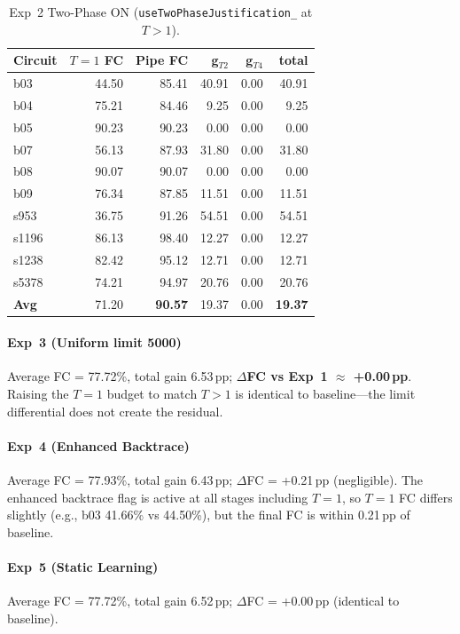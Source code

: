 \documentclass[conference]{IEEEtran}
\begin{document}
\begin{table}[t]
\caption{Exp~2 Two-Phase ON (\texttt{useTwoPhaseJustification\_} at $T{>}1$).}
\label{tab:exp2}
\centering
\footnotesize
\begin{tabular}{@{}lrrrrr@{}}
\toprule
Circuit & $T{=}1$ FC & Pipe FC & g$_{T2}$ & g$_{T4}$ & total \\
\midrule
b03   & 44.50 & 85.41 & 40.91 & 0.00 & 40.91 \\
b04   & 75.21 & 84.46 & 9.25  & 0.00 & 9.25 \\
b05   & 90.23 & 90.23 & 0.00  & 0.00 & 0.00 \\
b07   & 56.13 & 87.93 & 31.80 & 0.00 & 31.80 \\
b08   & 90.07 & 90.07 & 0.00  & 0.00 & 0.00 \\
b09   & 76.34 & 87.85 & 11.51 & 0.00 & 11.51 \\
s953  & 36.75 & 91.26 & 54.51 & 0.00 & 54.51 \\
s1196 & 86.13 & 98.40 & 12.27 & 0.00 & 12.27 \\
s1238 & 82.42 & 95.12 & 12.71 & 0.00 & 12.71 \\
s5378 & 74.21 & 94.97 & 20.76 & 0.00 & 20.76 \\
\midrule
\textbf{Avg} & 71.20 & \textbf{90.57} & 19.37 & 0.00 & \textbf{19.37} \\
\bottomrule
\end{tabular}
\end{table}

\paragraph{Exp~3 (Uniform limit 5000)} Average FC = 77.72\%, total gain
6.53\,pp; \textbf{$\Delta$FC vs Exp~1 $\approx$ +0.00\,pp}. Raising the $T{=}1$
budget to match $T{>}1$ is identical to baseline---the limit differential does
not create the residual.

\paragraph{Exp~4 (Enhanced Backtrace)} Average FC = 77.93\%, total gain
6.43\,pp; $\Delta$FC = +0.21\,pp (negligible). The enhanced backtrace flag is
active at all stages including $T{=}1$, so $T{=}1$ FC differs slightly (e.g.,
b03 41.66\% vs 44.50\%), but the final FC is within 0.21\,pp of baseline.

\paragraph{Exp~5 (Static Learning)} Average FC = 77.72\%, total gain 6.52\,pp;
$\Delta$FC = +0.00\,pp (identical to baseline).
\end{document}
